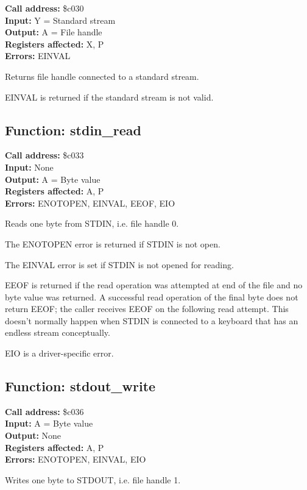 \textbf{Call address:} \$c030\\
\textbf{Input:} Y = Standard stream \\
\textbf{Output:} A = File handle \\
\textbf{Registers affected:} X, P \\
\textbf{Errors:} EINVAL

Returns file handle connected to a standard stream.

EINVAL is returned if the standard stream is not valid.


\subsection{Function: stdin\_read}

\textbf{Call address:} \$c033\\
\textbf{Input:} None \\
\textbf{Output:} A = Byte value \\
\textbf{Registers affected:} A, P \\
\textbf{Errors:} ENOTOPEN, EINVAL, EEOF, EIO

Reads one byte from STDIN, i.e. file handle 0.

The ENOTOPEN error is returned if STDIN is not open.

The EINVAL error is set if STDIN is not opened for reading.

EEOF is returned if the read operation was attempted at end of the file and 
no byte value was returned. A successful read operation of the final byte does 
not return EEOF; the caller receives EEOF on the following read attempt. This
doesn't normally happen when STDIN is connected to a keyboard that
has an endless stream conceptually.

EIO is a driver-specific error.


\subsection{Function: stdout\_write}

\textbf{Call address:} \$c036\\
\textbf{Input:} A = Byte value \\
\textbf{Output:} None \\
\textbf{Registers affected:} A, P \\
\textbf{Errors:} ENOTOPEN, EINVAL, EIO

Writes one byte to STDOUT, i.e. file handle 1.


